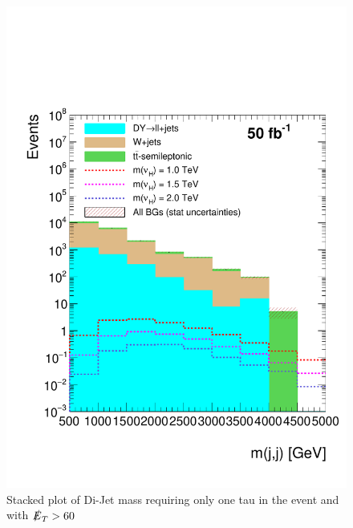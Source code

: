 \begin{figure}[H]
\centering
\includegraphics[width=\linewidth]{StackPlots/mjj_1Tau_met60_50ifb.pdf}
\caption{Stacked plot of Di-Jet mass requiring only one tau in the event and with $\slashed{E}_{T} > 60$}
\label{fig: mjj1tauMet60}
\end{figure}





